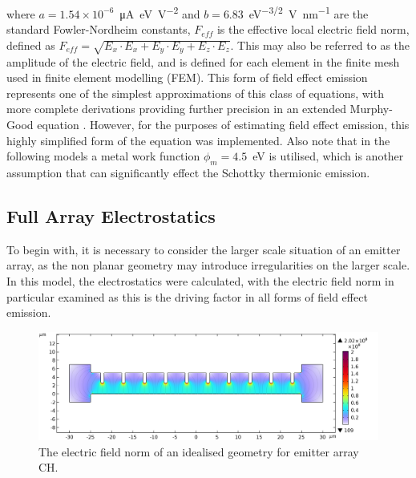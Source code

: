 \begin{refsection}
\noindent where $a=1.54\times10^{-6}$~\si{\micro\ampere\electronvolt\per\volt\squared} and $b=6.83$~\si{\electronvolt^{-3/2}\volt\per\nano\metre} are the standard Fowler-Nordheim constants, $F_{eff}$ is the effective local electric field norm, defined as $F_{eff} = \sqrt{E_{x}\cdot E_{x} + E_{y}\cdot E_{y} + E_{z}\cdot E_{z}}$. This may also be referred to as the amplitude of the electric field, and is defined for each element in the finite mesh used in finite element modelling (FEM). This form of field effect emission represents one of the simplest approximations of this class of equations, with more complete derivations providing further precision in an extended Murphy-Good equation \cite{Forbes2019}. However, for the purposes of estimating field effect emission, this highly simplified form of the equation was implemented. Also note that in the following models a metal work function $\phi_{m}=4.5$~\si{\electronvolt} is utilised, which is another assumption that can significantly effect the Schottky thermionic emission.

\subsection{Full Array Electrostatics}
To begin with, it is necessary to consider the larger scale situation of an emitter array, as the non planar geometry may introduce irregularities on the larger scale. In this model, the electrostatics were calculated, with the electric field norm in particular examined as this is the driving factor in all forms of field effect emission.

\begin{figure}[H]
    \centering
    \includegraphics[width=\linewidth]{Chapter7/Figs/Raster/Comsol/+150_array_es.png}
    \caption{The electric field norm of an idealised geometry for emitter array CH.}
    \label{fig:c_150_array_es_norme}
\end{figure}


\end{refsection}
